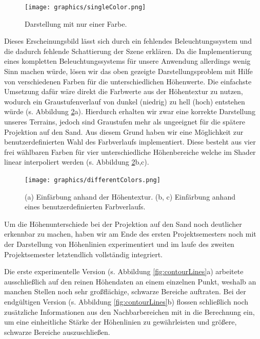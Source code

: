 \begin{Spacing}{\mylinespace}
\begin{figure}[h!]
	\centering
	\vspace*{20px}
	\texttt{[image: graphics/singleColor.png]}
	\caption{Darstellung mit nur einer Farbe.}
	\label{fig:singleColor}
\end{figure}

Dieses Erscheinungsbild lässt sich durch ein fehlendes Beleuchtungssystem und die dadurch fehlende Schattierung der Szene erklären. Da die Implementierung eines kompletten Beleuchtungssystems für unsere Anwendung allerdings wenig Sinn machen würde, lösen wir das oben gezeigte Darstellungsproblem mit Hilfe von verschiedenen Farben für die unterschiedlichen Höhenwerte. Die einfachste Umsetzung dafür wäre direkt die Farbwerte aus der Höhentextur zu nutzen, wodurch ein Graustufenverlauf von dunkel (niedrig) zu hell (hoch) entstehen würde (s. Abbildung \ref{fig:differentColors}a). Hierdurch erhalten wir zwar eine korrekte Darstellung unseres Terrains, jedoch sind Graustufen mehr als ungeeignet für die spätere Projektion auf den Sand. Aus diesem Grund haben wir eine Möglichkeit zur benutzerdefinierten Wahl des Farbverlaufs implementiert. Diese besteht aus vier frei wählbaren Farben für vier unterschiedliche Höhenbereiche welche im Shader linear interpoliert werden (s. Abbildung \ref{fig:differentColors}b,c).    

\begin{figure}[h!]
	\centering
	\vspace*{30px}
	\texttt{[image: graphics/differentColors.png]}
	\caption{(a) Einfärbung anhand der Höhentextur. (b, c) Einfärbung anhand eines benutzerdefinierten Farbverlaufs.}
	\label{fig:differentColors}
\end{figure}

Um die Höhenunterschiede bei der Projektion auf den Sand noch deutlicher erkennbar zu machen, haben wir am Ende des ersten Projektsemesters noch mit der Darstellung von Höhenlinien experimentiert und im laufe des zweiten Projektsemester letztendlich vollständig integriert.

Die erste experimentelle Version (s. Abbildung \ref{fig:contourLines}a) arbeitete ausschließlich auf den reinen Höhendaten an einem einzelnen Punkt, weshalb an manchen Stellen noch sehr großflächige, schwarze Bereiche auftraten. Bei der endgültigen Version (s. Abbildung \ref{fig:contourLines}b) flossen schließlich noch zusätzliche Informationen aus den Nachbarbereichen mit in die Berechnung ein, um eine einheitliche Stärke der Höhenlinien zu gewährleisten und größere, schwarze Bereiche auszuschließen.  



\end{Spacing}
